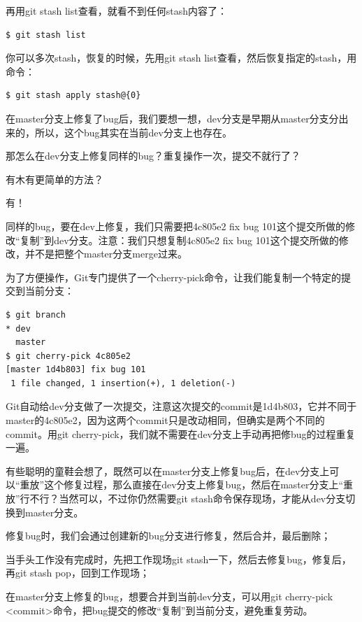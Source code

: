 再用git stash list查看，就看不到任何stash内容了：

\begin{verbatim}
$ git stash list
\end{verbatim}

你可以多次stash，恢复的时候，先用git stash list查看，然后恢复指定的stash，用命令：

\begin{verbatim}
$ git stash apply stash@{0}
\end{verbatim}

在master分支上修复了bug后，我们要想一想，dev分支是早期从master分支分出来的，所以，这个bug其实在当前dev分支上也存在。

那怎么在dev分支上修复同样的bug？重复操作一次，提交不就行了？

有木有更简单的方法？

有！

同样的bug，要在dev上修复，我们只需要把4c805e2 fix bug 101这个提交所做的修改“复制”到dev分支。注意：我们只想复制4c805e2 fix bug 101这个提交所做的修改，并不是把整个master分支merge过来。

为了方便操作，Git专门提供了一个cherry-pick命令，让我们能复制一个特定的提交到当前分支：

\begin{verbatim}
$ git branch
* dev
  master
$ git cherry-pick 4c805e2
[master 1d4b803] fix bug 101
 1 file changed, 1 insertion(+), 1 deletion(-)
\end{verbatim}

Git自动给dev分支做了一次提交，注意这次提交的commit是1d4b803，它并不同于master的4c805e2，因为这两个commit只是改动相同，但确实是两个不同的commit。用git cherry-pick，我们就不需要在dev分支上手动再把修bug的过程重复一遍。

有些聪明的童鞋会想了，既然可以在master分支上修复bug后，在dev分支上可以“重放”这个修复过程，那么直接在dev分支上修复bug，然后在master分支上“重放”行不行？当然可以，不过你仍然需要git stash命令保存现场，才能从dev分支切换到master分支。

\begin{tcolorbox}

修复bug时，我们会通过创建新的bug分支进行修复，然后合并，最后删除；

当手头工作没有完成时，先把工作现场git stash一下，然后去修复bug，修复后，再git stash pop，回到工作现场；

在master分支上修复的bug，想要合并到当前dev分支，可以用git cherry-pick <commit>命令，把bug提交的修改“复制”到当前分支，避免重复劳动。
\end{tcolorbox}

